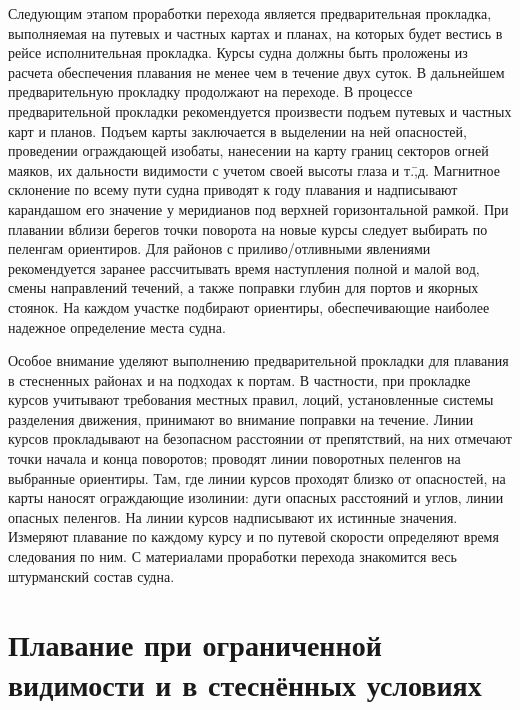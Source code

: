 \documentclass[a4paper, 12pt, twoside, final, book, russian, fittopage, cyremdash]{ncc}
\begin{document}
Следующим этапом проработки перехода является предварительная прокладка, выполняемая на путевых и частных картах и планах, на которых будет вестись в рейсе исполнительная прокладка. Курсы судна должны быть проложены из расчета обеспечения плавания не менее чем в течение двух суток. В дальнейшем предварительную прокладку продолжают на переходе. В процессе предварительной прокладки рекомендуется произвести подъем путевых и частных карт и планов. Подъем карты заключается в выделении на ней опасностей, проведении ограждающей изобаты, нанесении на карту границ секторов огней маяков, их дальности видимости с учетом своей высоты глаза и т.\=,д. Магнитное склонение по всему пути судна приводят к году плавания и надписывают карандашом его значение у меридианов под верхней горизонтальной рамкой. При плавании вблизи берегов точки поворота на новые курсы следует выбирать по пеленгам ориентиров. Для районов с приливо\-/отливными явлениями рекомендуется заранее рассчитывать время наступления полной и малой вод, смены направлений течений, а также поправки глубин для портов и якорных стоянок. На каждом участке подбирают ориентиры, обеспечивающие наиболее надежное определение места судна.
 
Особое внимание уделяют выполнению предварительной прокладки для плавания в стесненных районах и на подходах к портам. В частности, при прокладке курсов учитывают требования местных правил, лоций, установленные системы разделения движения, принимают во внимание поправки на течение. Линии курсов прокладывают на безопасном расстоянии от препятствий, на них отмечают точки начала и конца поворотов; проводят линии поворотных пеленгов на выбранные ориентиры. Там, где линии курсов проходят близко от опасностей, на карты наносят ограждающие изолинии: дуги опасных расстояний и углов, линии опасных пеленгов. На линии курсов надписывают их истинные значения. Измеряют плавание по каждому курсу и по путевой скорости определяют время следования по ним. С материалами проработки перехода знакомится весь штурманский состав судна. 

\section{Плавание при ограниченной видимости и в стеснённых условиях}
\end{document}
